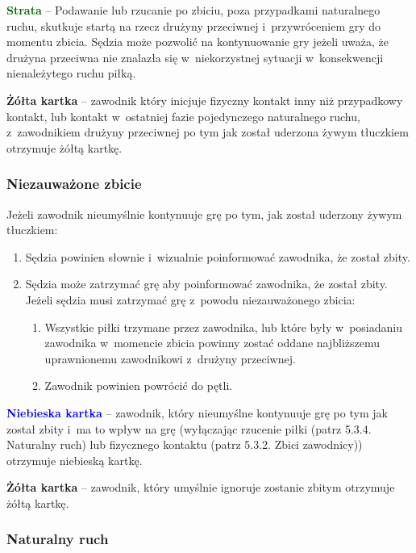\documentclass[12pt]{article}
\newcommand\yellowcard[1]{\bgroup\textcolor{darkyellow}{\textbf{#1}}}
\newcommand\bluecard[1]{\bgroup\textcolor{blue}{\textbf{#1}}}
\newcommand\other[1]{\bgroup\textcolor{darkgreen}{\textbf{#1}}}
\begin{document}
\other{Strata} -- Podawanie lub rzucanie po zbiciu, poza przypadkami
naturalnego ruchu, skutkuje startą na rzecz drużyny przeciwnej i~przywróceniem gry do momentu zbicia. Sędzia może pozwolić na
kontynuowanie gry jeżeli uważa, że drużyna przeciwna nie znalazła się w~niekorzystnej sytuacji w~konsekwencji nienależytego ruchu piłką.

\yellowcard{Żółta kartka} -- zawodnik który inicjuje fizyczny kontakt inny niż
przypadkowy kontakt, lub kontakt w~ostatniej fazie pojedynczego
naturalnego ruchu, z~zawodnikiem drużyny przeciwnej po tym jak został
uderzona żywym tłuczkiem otrzymuje żółtą kartkę.

\subsubsection{Niezauważone zbicie}

Jeżeli zawodnik nieumyślnie kontynuuje grę po tym, jak został uderzony
żywym tłuczkiem:
\begin{enumerate}
	\item Sędzia powinien słownie i~wizualnie poinformować zawodnika, że został
	      zbity.

	\item Sędzia może zatrzymać grę aby poinformować zawodnika, że został
	      zbity. Jeżeli sędzia musi zatrzymać grę z~powodu niezauważonego zbicia:
	      \begin{enumerate}
		      \item Wszystkie piłki trzymane przez zawodnika, lub które były w~posiadaniu
		            zawodnika w~momencie zbicia powinny zostać oddane najbliższemu
		            uprawnionemu zawodnikowi z~drużyny przeciwnej.

		      \item Zawodnik powinien powrócić do pętli.
	      \end{enumerate}
\end{enumerate}

\bluecard{Niebieska kartka} -- zawodnik, który nieumyślne kontynuuje grę po
tym jak został zbity i~ma to wpływ na grę (wyłączając rzucenie piłki
(patrz 5.3.4. Naturalny ruch) lub fizycznego kontaktu (patrz 5.3.2.
Zbici zawodnicy)) otrzymuje niebieską kartkę.

\yellowcard{Żółta kartka} -- zawodnik, który umyślnie ignoruje zostanie zbitym
otrzymuje żółtą kartkę.

\subsubsection{Naturalny ruch}
\end{document}
